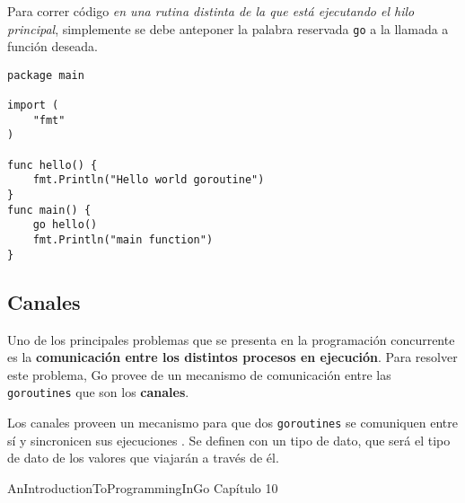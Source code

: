 Para correr código \emph{en una rutina distinta de la que está ejecutando el hilo principal}, simplemente se debe anteponer la palabra reservada \texttt{go} a la llamada a función deseada.

\vspace*{5mm}
\begin{lstlisting}[title={Ejecución concurrente con \texttt{goroutines} \autocite{GolangBotGoroutines}}]
package main

import (  
    "fmt"
)

func hello() {  
    fmt.Println("Hello world goroutine")
}
func main() {  
    go hello()
    fmt.Println("main function")
}
\end{lstlisting}


\subsection{Canales}

Uno de los principales problemas que se presenta en la programación concurrente es la \textbf{comunicación entre los distintos procesos en ejecución}. Para resolver este problema, Go provee de un mecanismo de comunicación entre las \texttt{goroutines} que son los \textbf{canales}. 

Los canales proveen un mecanismo para que dos \texttt{goroutines} se comuniquen entre sí y sincronicen sus ejecuciones \autocite{AnIntroductionToProgrammingInGo:Concurrency}. Se definen con un tipo de dato, que será el tipo de dato de los valores que viajarán a través de él.

\Large AnIntroductionToProgrammingInGo Capítulo 10













\clearpage
\printbibliography



